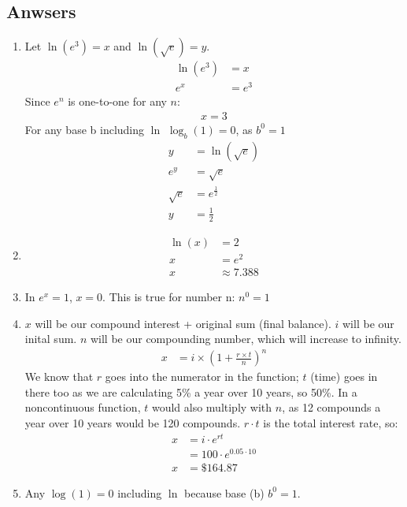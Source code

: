 \documentclass{article}
\begin{document}
\subsection{Anwsers}
\begin{enumerate}
  \item Let $\ln(e^{3}) = x$ and $\ln(\sqrt e) = y$.
    \begin{align*}
      \ln(e^{3}) &= x \\
      e^{x} &= e^{3}
    \end{align*}
     Since $e^{n}$ is one-to-one for any $n$:
    \begin{align*}
      x = 3
    \end{align*}
    For any base b including $\ln$ $\log_{b}(1) = 0$, as $b^{0} = 1$ \\
    \begin{align*}
      y &= \ln(\sqrt e) \\
      e^{y} &= \sqrt e \\
      \sqrt e &= e^{\frac{1}{2}} \\
      y &= \frac{1}{2}
    \end{align*}
    
  \item 
    \begin{align*}
      \ln(x) &= 2 \\
      x &= e^{2} \\
      x &\approx 7.388
    \end{align*} 
  \item In $e^{x} = 1$, $x = 0$. This is true for number n: $n^{0} = 1$ 
  \item $x$ will be our compound interest + original sum (final balance). $i$ will be our inital sum. $n$ will be our compounding number, which will increase to infinity.
    \begin{align*}
      x &= i \times \left(1 + \frac{r \times t}{n}\right)^n
    \end{align*}
    We know that $r$ goes into the numerator in the function; $t$ (time) goes in there too as we are calculating 5\% 
    a year over 10 years, so 50\%. In a noncontinuous function, $t$ would also multiply with $n$, 
    as 12 compounds a year over 10 years would be 120 compounds. $r \cdot t$ is the total interest rate, so:
    \begin{align*}
      x &= i \cdot e^{r t} \\
        &= 100 \cdot e^{0.05 \cdot 10} \\
      x &= \$164.87
    \end{align*}
  \item Any $\log(1) = 0$ including $\ln$ because base (b) $b^{0} = 1$.
\end{enumerate}
\end{document}
